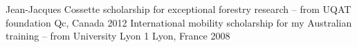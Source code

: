 \begin{cvhonors}
  \cvhonor
    {Jean-Jacques Cossette scholarship}
    {for exceptional forestry research – from UQAT foundation}
    {Qc, Canada}
    {2012}
 \cvhonor
    {}
    {}
    {}
    {}
    \cvhonor
    {International mobility scholarship}
    {for my Australian training – from University Lyon 1}
    {Lyon, France}
    {2008}

\end{cvhonors}
